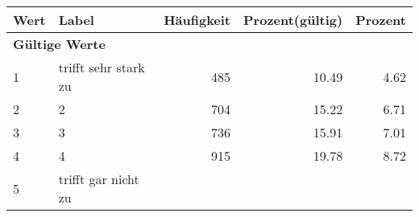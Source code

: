      \begin{longtable}{lXrrr}
     \toprule
     \textbf{Wert} & \textbf{Label} & \textbf{Häufigkeit} & \textbf{Prozent(gültig)} & \textbf{Prozent} \\
     \endhead
     \midrule
     \multicolumn{5}{l}{\textbf{Gültige Werte}}\\

     1 &
     \multicolumn{1}{X}{ trifft sehr stark zu   } &


       \num{485} &
       \num[round-mode=places,round-precision=2]{10,49} &
         \num[round-mode=places,round-precision=2]{4,62} \\

     2 &
     \multicolumn{1}{X}{ 2   } &


       \num{704} &
       \num[round-mode=places,round-precision=2]{15,22} &
         \num[round-mode=places,round-precision=2]{6,71} \\

     3 &
     \multicolumn{1}{X}{ 3   } &


       \num{736} &
       \num[round-mode=places,round-precision=2]{15,91} &
         \num[round-mode=places,round-precision=2]{7,01} \\

     4 &
     \multicolumn{1}{X}{ 4   } &


       \num{915} &
       \num[round-mode=places,round-precision=2]{19,78} &
         \num[round-mode=places,round-precision=2]{8,72} \\

     5 &
     \multicolumn{1}{X}{ trifft gar nicht zu   } &



\end{longtable}
